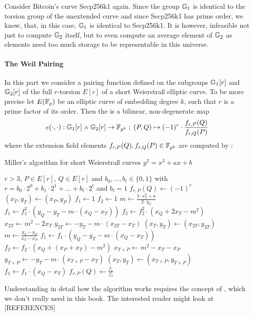 \begin{example}Consider Bitcoin's curve Secp256k1 again. Since the group $\mathbb{G}_1$ is identical to the torsion group of the unextended curve and since Secp256k1 has prime order, we know, that, in this case, $\mathbb{G}_1$ is identical to Secp256k1. It is however, infeasible not just to compute $\mathbb{G}_2$ itself, but to even compute an average element of $\mathbb{G}_2$ as elements need too much storage to be representable in this universe.
\end{example}
\paragraph{The Weil Pairing} In this part we consider a pairing function defined on
the subgroups $\mathbb{G}_1[r]$ and $\mathbb{G}_2[r]$ of the full $r$-torsion $E[r]$ of a short Weierstraß elliptic curve. To be more precise let $E(\mathbb{F}_p)$ be an elliptic curve of embedding degree $k$, such that $r$ is a prime factor of its order. Then the  is a bilinear, non-degenerate map
\begin{equation}
e(\cdot,\cdot) : \mathbb{G}_1[r] \times \mathbb{G}_2[r] \to \mathbb{F}_{p^k}\; ;\; 
(P,Q)\mapsto (-1)^r \cdot \frac{f_{r,P}(Q)}{f_{r,Q}(P)}
\end{equation} 
where the extension field elements $f_{r,P}(Q), f_{r,Q}(P)\in \mathbb{F}_{p^k}$ are computed by :
\begin{algorithm}\caption{Miller's algorithm for short Weierstraß curves $y^2 = x^3 +ax +b$}
\label{alg_projective_group_law}
\begin{algorithmic}[0]
\Require $r>3$, $P \in E[r]$, $Q\in E[r]$ and
\State $b_0,\ldots, b_t\in \{0,1\}$ with $r= b_0\cdot 2^0 + b_1\cdot 2^1 + \ldots + b_t\cdot 2^t$ and $b_t=1$
	\State {} $f_{r,P}(Q) \gets (-1)^r$
\EndIf
\State $(x_T,y_T) \gets (x_P,y_P)$
\State $f_1\gets 1$
\State $f_2\gets 1$
	\State $m \gets \frac{3\cdot x_T^2+a}{2\cdot y_T}$	
    \State $f_1 \gets f_1^2\cdot (y_Q - y_T - m\cdot(x_Q-x_T))$
	\State $f_2 \gets f_2^2\cdot (x_Q + 2x_T -m^2)$
	\State $x_{2T} \gets m^2 - 2 x_T$
	\State $y_{2T} \gets -y_T - m\cdot (x_{2T}-x_T)$
	\State $(x_T,y_T)\gets (x_{2T},y_{2T})$ 
		\State $m \gets \frac{y_T -y_P}{x_T - x_P}$
		\State $f_1 \gets f_1\cdot (y_Q -y_T -m\cdot (x_Q - x_T))$
		\State $f_2 \gets f_2\cdot (x_Q + (x_P+x_T) - m^2)$
		\State $x_{T+P} \gets m^2 -x_T -x_P$
		\State $y_{T+P}\gets -y_T - m\cdot (x_{T+P}-x_T)$
		\State $(x_T,y_T)\gets (x_{T+P},y_{T+P})$
	\EndIf
\EndFor
\State $f_1 \gets f_1\cdot (x_Q - x_T)$
\State {} $f_{r,P}(Q) \gets \frac{f_1}{f_2}$
\EndProcedure
\end{algorithmic}
\end{algorithm}
Understanding in detail how the algorithm works requires the concept of , which we don't really need in this book. The interested reader might look at [REFERENCES]

